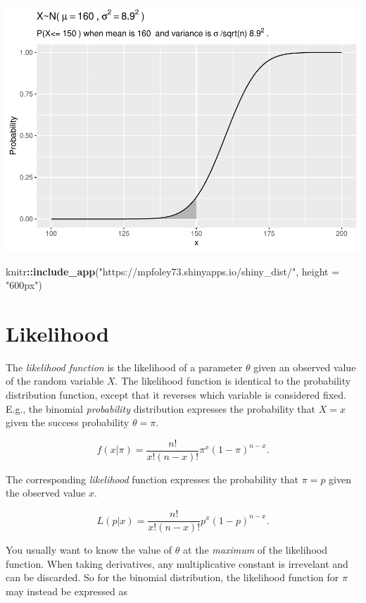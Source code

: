 \documentclass[
]{book}
\newenvironment{Shaded}{\begin{snugshade}}{\end{snugshade}}
\newcommand{\DataTypeTok}[1]{\textcolor[rgb]{0.13,0.29,0.53}{#1}}
\newcommand{\KeywordTok}[1]{\textcolor[rgb]{0.13,0.29,0.53}{\textbf{#1}}}
\newcommand{\NormalTok}[1]{#1}
\newcommand{\OperatorTok}[1]{\textcolor[rgb]{0.81,0.36,0.00}{\textbf{#1}}}
\newcommand{\StringTok}[1]{\textcolor[rgb]{0.31,0.60,0.02}{#1}}
\begin{document}
\includegraphics{data-sci_files/figure-latex/unnamed-chunk-27-1.pdf}

\begin{Shaded}
\begin{Highlighting}[]
\NormalTok{knitr}\OperatorTok{::}\KeywordTok{include_app}\NormalTok{(}\StringTok{"https://mpfoley73.shinyapps.io/shiny_dist/"}\NormalTok{, }
  \DataTypeTok{height =} \StringTok{"600px"}\NormalTok{)}
\end{Highlighting}
\end{Shaded}

\hypertarget{likelihood}{%
\section{Likelihood}\label{likelihood}}

The \emph{likelihood function} is the likelihood of a parameter \(\theta\) given an observed value of the random variable \(X\). The likelihood function is identical to the probability distribution function, except that it reverses which variable is considered fixed. E.g., the binomial \emph{probability} distribution expresses the probability that \(X = x\) given the success probability \(\theta = \pi\).

\[f(x|\pi) = \frac{n!}{x!(n-x)!} \pi^x (1-\pi)^{n-x}.\]

The corresponding \emph{likelihood} function expresses the probability that \(\pi = p\) given the observed value \(x\).

\[L(p|x) = \frac{n!}{x!(n-x)!} p^x (1-p)^{n-x}.\]

You usually want to know the value of \(\theta\) at the \emph{maximum} of the likelihood function. When taking derivatives, any multiplicative constant is irrevelant and can be discarded. So for the binomial distribution, the likelihood function for \(\pi\) may instead be expressed as
\end{document}
